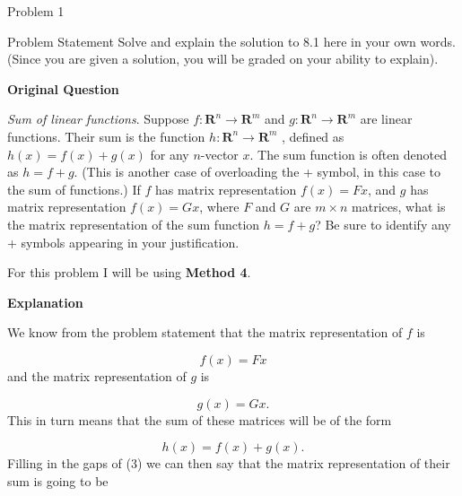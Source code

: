 \begin{problem}{Problem 1}
    \begin{statement}{Problem Statement}
        Solve and explain the solution to 8.1  here in your own words. (Since you are given a solution, you will be graded on your ability to explain). \vspace*{1em}

        \noindent \textbf{Original Question} \vspace*{1em}

        \textit{Sum of linear functions}. Suppose $f : \mathbf{R}^{n} \rightarrow \mathbf{R}^{m}$ and $g : \mathbf{R}^{n} \rightarrow \mathbf{R}^{m}$ are linear functions. Their sum is the function 
        $h : \mathbf{R}^{n} \rightarrow \mathbf{R}^{m}$ , defined as $h(x) = f (x) + g(x)$ for any $n$-vector $x$. The sum function is often denoted as $h = f + g$. (This is another case of overloading
        the + symbol, in this case to the sum of functions.) If $f$ has matrix representation $f(x) = Fx$, and $g$ has matrix representation $f(x) = Gx$, where $F$ and $G$ are $m \times n$ matrices, 
        what is the matrix representation of the sum function $h = f + g$? Be sure to identify any + symbols appearing in your justification.
    \end{statement}

    \begin{Highlight}[Solution]
        For this problem I will be using \textbf{Method 4}. \vspace*{1em}

        \noindent \textbf{Explanation} \vspace*{1em}

        We know from the problem statement that the matrix representation of $f$ is

        \begin{equation}
            f(x) = Fx
        \end{equation}
        and the matrix representation of $g$ is

        \begin{equation}
            g(x) = Gx.
        \end{equation}
        This in turn means that the sum of these matrices will be of the form

        \begin{equation}
            h(x) = f(x) + g(x).
        \end{equation}
        Filling in the gaps of (3) we can then say that the matrix representation of their sum is going to be


\end{Highlight}
\end{problem}
